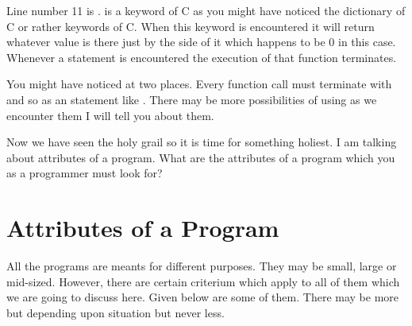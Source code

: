 Line number 11 is .  is a keyword of C as you might
have noticed the dictionary of C or rather keywords of C. When this keyword is
encountered it will return whatever value is there just by the side of it which
happens to be 0 in this case. Whenever a  statement is encountered
the execution of that function terminates.

You might have noticed \type{;} at two places. Every function call must terminate 
with \type{;} and so as an statement like . There may be more 
possibilities of using \type{;} as we encounter them I will tell you about them.

Now we have seen the holy grail so it is time for something holiest. I am talking
about attributes of a program. What are the attributes of a program which you as a
programmer must look for?

\section{Attributes of a Program}
All the programs are meants for different purposes. They may be small, large or
mid-sized. However, there are certain criterium which apply to all of them which
we are going to discuss here. Given below are some of them. There may
be more but depending upon situation but never less.

